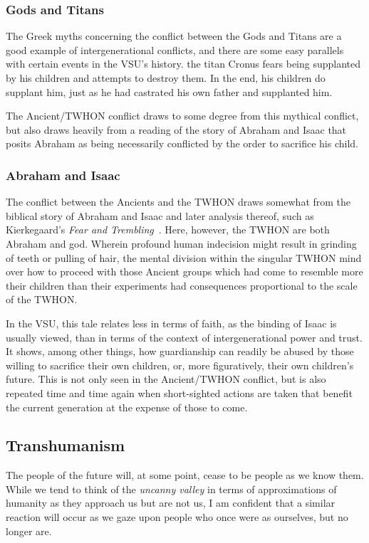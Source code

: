 \subsubsection{Gods and Titans}

The Greek myths concerning the conflict between the Gods and Titans
are a good example of intergenerational conflicts, and there are some
easy parallels with certain events in the VSU's history. the titan
Cronus fears being supplanted by his children and attempts to destroy
them. In the end, his children do supplant him, just as he had
castrated his own father and supplanted him.

The Ancient/TWHON conflict draws to some degree from this mythical
conflict, but also draws heavily from a reading of the story of
Abraham and Isaac that posits Abraham as being necessarily conflicted
by the order to sacrifice his child.

\subsubsection{Abraham and Isaac}

The conflict between the Ancients and the TWHON draws somewhat from
the biblical story of Abraham and Isaac and later analysis thereof,
such as Kierkegaard's \emph{Fear and
Trembling}~\cite{KierkegaardFearandTrembling}. Here, however, the
TWHON are both Abraham and god. Wherein profound human indecision
might result in grinding of teeth or pulling of hair, the mental
division within the singular TWHON mind over how to proceed with those
Ancient groups which had come to resemble more their children than
their experiments had consequences proportional to the scale of the
TWHON.

In the VSU, this tale relates less in terms of faith, as the binding
of Isaac is usually viewed, than in terms of the context of
intergenerational power and trust. It shows, among other things, how
guardianship can readily be abused by those willing to sacrifice their
own children, or, more figuratively, their own children's future. This
is not only seen in the Ancient/TWHON conflict, but is also repeated
time and time again when short-sighted actions are taken that benefit
the current generation at the expense of those to come.

\subsection{Transhumanism}

The people of the future will, at some point, cease to be people as we
know them. While we tend to think of the {\em uncanny valley} in terms
of approximations of humanity as they approach us but are not us, I am
confident that a similar reaction will occur as we gaze upon people
who once were as ourselves, but no longer are.

